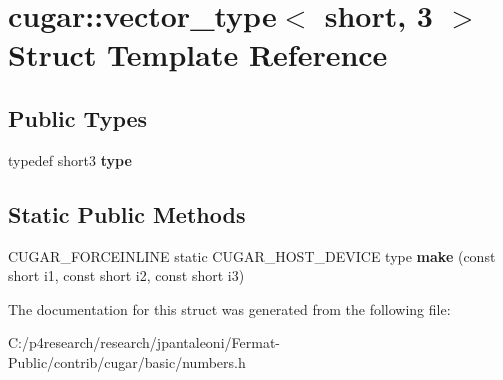 \hypertarget{structcugar_1_1vector__type_3_01short_00_013_01_4}{}\section{cugar\+:\+:vector\+\_\+type$<$ short, 3 $>$ Struct Template Reference}
\label{structcugar_1_1vector__type_3_01short_00_013_01_4}
\subsection*{Public Types}
\begin{DoxyCompactItemize}
\item 
\mbox{\label{structcugar_1_1vector__type_3_01short_00_013_01_4_ab2507e7bca70c63403d37890bb8c8612}} 
typedef short3 {\bfseries type}
\end{DoxyCompactItemize}
\subsection*{Static Public Methods}
\begin{DoxyCompactItemize}
\item 
\mbox{\label{structcugar_1_1vector__type_3_01short_00_013_01_4_a352af0bdea1975327703c4ba3fc8b942}} 
C\+U\+G\+A\+R\+\_\+\+F\+O\+R\+C\+E\+I\+N\+L\+I\+NE static C\+U\+G\+A\+R\+\_\+\+H\+O\+S\+T\+\_\+\+D\+E\+V\+I\+CE type {\bfseries make} (const short i1, const short i2, const short i3)
\end{DoxyCompactItemize}


The documentation for this struct was generated from the following file\+:\begin{DoxyCompactItemize}
\item 
C\+:/p4research/research/jpantaleoni/\+Fermat-\/\+Public/contrib/cugar/basic/numbers.\+h\end{DoxyCompactItemize}
